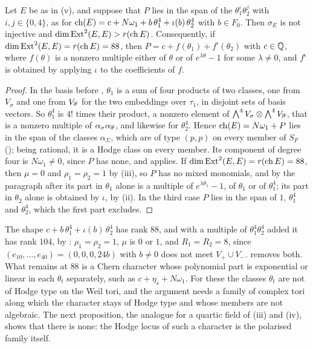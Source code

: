 \begin{proposition}
\label{prop:quarticweiltori}
Let $E$ be as in \textup{(v)}, and suppose that $P$
lies in the span of the $\theta_{1}^{i}\theta_{2}^{j}$ with
$i,j\in\{0,4\}$, as for $\operatorname{ch}(E)=c+N\omega_{1}+b\,\theta_{1}^{4}+
\iota(b)\,\theta_{2}^{4}$ with $b\in F_{0}$. Then $\sigma_{E}$ is not
injective and $\dim\operatorname{Ext}^{2}(E,E)>r(\operatorname{ch} E)$. Consequently, if
$\dim\operatorname{Ext}^{2}(E,E)=r(\operatorname{ch} E)=88$, then $P=c+f(\theta_{1})+f^{\iota}(\theta_{2})$
with $c\in\mathbb{Q}$, where $f(\theta)$ is a nonzero multiple either of $\theta$ or
of $e^{\lambda\theta}-1$ for some $\lambda\ne0$, and $f^{\iota}$ is obtained
by applying $\iota$ to the coefficients of $f$.
\end{proposition}

\begin{proof}
In the basis before , $\theta_{1}$ is a sum of four
products of two classes, one from $V_{\sigma}$ and one from $V_{\overline{\sigma}}$
for the two embeddings over $\tau_{1}$, in disjoint sets of basis vectors.
So $\theta_{1}^{4}$ is $4!$ times their product, a nonzero element of
$\bigwedge^{4}V_{\sigma}\otimes\bigwedge^{4}V_{\overline{\sigma}}$, that is a
nonzero multiple of $\alpha_{\sigma}\alpha_{\overline{\sigma}}$, and likewise for
$\theta_{2}^{4}$. Hence $\operatorname{ch}(E)=N\omega_{1}+P$ lies in the span of the
classes $\alpha_{\Sigma}$, which are of type $(p,p)$ on every member of
$S_{F}$ (); being rational, it is a Hodge class on
every member. Its component of degree four is $N\omega_{1}\ne0$, since $P$
has none, and  applies. If $\dim\operatorname{Ext}^{2}(E,E)=
r(\operatorname{ch} E)=88$, then $\mu=0$ and $\rho_{1}=\rho_{2}=1$ by
(iii), so $P$ has no mixed monomials, and by the
paragraph after  its part in $\theta_{1}$ alone is a
multiple of $e^{\lambda\theta_{1}}-1$, of $\theta_{1}$ or of $\theta_{1}^{4}$;
its part in $\theta_{2}$ alone is obtained by $\iota$, by
(ii). In the third case $P$ lies in the span of
$1$, $\theta_{1}^{4}$ and $\theta_{2}^{4}$, which the first part excludes.
\end{proof}

The shape $c+b\,\theta_{1}^{4}+\iota(b)\,\theta_{2}^{4}$ has rank $88$, and
with a multiple of $\theta_{1}^{4}\theta_{2}^{4}$ added it has rank $104$,
by : $\rho_{1}=\rho_{2}=1$, $\mu$ is $0$ or $1$, and
$R_{1}=R_{2}=8$, since $(e_{10},\dots,e_{40})=(0,0,0,24b)$ with $b\ne0$ does
not meet $V_{+}\cup V_{-}$.  removes
both. What remains at $88$ is a Chern character whose polynomial part is
exponential or linear in each $\theta_{t}$ separately, such as
$c+\eta_{s}+N\omega_{1}$. For these the classes $\theta_{t}$ are not of Hodge
type on the Weil tori, and the argument needs a family of complex tori along
which the character stays of Hodge type and whose members are not algebraic.
The next proposition, the analogue for a quartic field of
(iii) and (iv), shows that there is none: the Hodge
locus of such a character is the polarised family itself.

